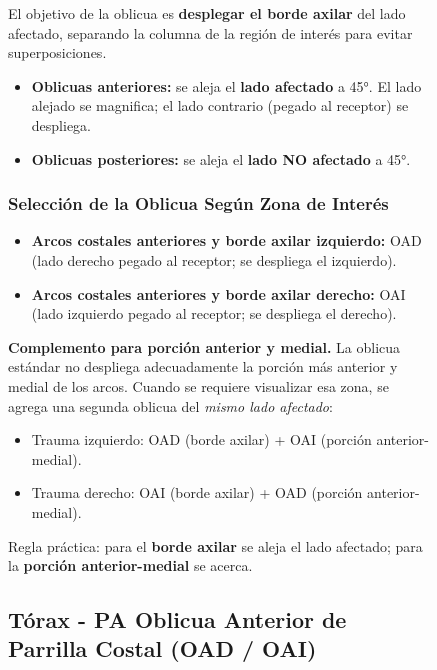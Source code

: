 \begin{figure}
{El objetivo de la oblicua es \textbf{desplegar el borde axilar} del lado afectado, separando la columna de la región de interés para evitar superposiciones.

\begin{itemize}
  \item \textbf{Oblicuas anteriores:} se aleja el \textbf{lado afectado} a 45°. El lado alejado se magnifica; el lado contrario (pegado al receptor) se despliega.
  \item \textbf{Oblicuas posteriores:} se aleja el \textbf{lado NO afectado} a 45°.
\end{itemize}

\subsubsection*{Selección de la Oblicua Según Zona de Interés}

\begin{itemize}
  \item \textbf{Arcos costales anteriores y borde axilar izquierdo:} OAD (lado derecho pegado al receptor; se despliega el izquierdo).
  \item \textbf{Arcos costales anteriores y borde axilar derecho:} OAI (lado izquierdo pegado al receptor; se despliega el derecho).
\end{itemize}

\noindent
\textbf{Complemento para porción anterior y medial.}
La oblicua estándar no despliega adecuadamente la porción más anterior y medial de los arcos. Cuando se requiere visualizar esa zona, se agrega una segunda oblicua del \emph{mismo lado afectado}:

\begin{itemize}
  \item Trauma izquierdo: OAD (borde axilar) + OAI (porción anterior-medial).
  \item Trauma derecho: OAI (borde axilar) + OAD (porción anterior-medial).
\end{itemize}

\noindent
Regla práctica: para el \textbf{borde axilar} se aleja el lado afectado; para la \textbf{porción anterior-medial} se acerca.


\subsection{Tórax - PA Oblicua Anterior de Parrilla Costal (OAD / OAI)}

}
\end{figure}
